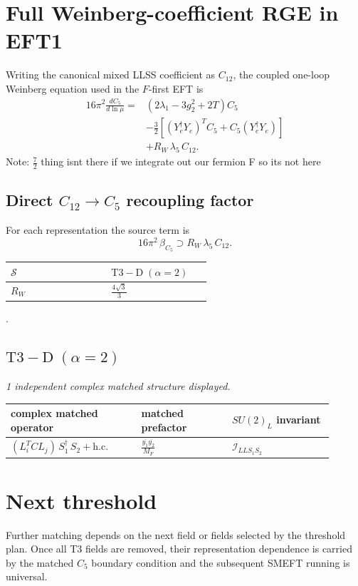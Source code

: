 \documentclass[9pt]{article}
\begin{document}
\section*{Full Weinberg-coefficient RGE in EFT1}
Writing the canonical mixed LLSS coefficient as $C_{12}$, the coupled one-loop Weinberg equation used in the $F$-first EFT is
\begin{align}
16\pi^2\frac{dC_5}{d\ln\mu}={}&(2\lambda_1-3g_2^2+2T)C_5\\
&-\frac32\left[(Y_e^\dagger Y_e)^T C_5+C_5(Y_e^\dagger Y_e)\right]\\
&+R_W\,\lambda_5\,C_{12}.
\end{align}
Note: $\frac{7}{2}$ thing isnt there if we integrate out our fermion F so its not here \subsection*{Direct $C_{12}\to C_5$ recoupling factor}
For each representation the source term is
\[16\pi^2\,\beta_{C_5}\supset R_W\,\lambda_5\,C_{12}.\]
\begin{longtable}{@{}p{0.37\linewidth}p{0.19\linewidth}@{}}
\toprule
$\mathcal{S}$ & $ \mathrm{T3-D}\;(\alpha=2) $ \\
\midrule
$R_W$ & $ \frac{4 \sqrt{3}}{3} $ \\
\bottomrule
\end{longtable}
.
\subsection*{$ \mathrm{T3-D}\;(\alpha=2) $}
\textit{1 independent complex matched structure displayed. }
\begin{longtable}{@{}p{0.36\linewidth}p{0.25\linewidth}p{0.29\linewidth}@{}}
\toprule
complex matched operator & matched prefactor & $SU(2)_L$ invariant \\
\midrule
$ (L_i^T C L_j)\,S_1^\dagger\,S_2+\mathrm{h.c.} $ & $ \frac{\overline{y_{1}} \overline{y_{2}}}{M_F} $ & $ \mathcal{I}_{LLS_1S_2} $ \\
\bottomrule
\end{longtable}
\section*{Next threshold}
Further matching depends on the next field or fields selected by the threshold plan.  Once all T3 fields are removed, their representation dependence is carried by the matched $C_5$ boundary condition and the subsequent SMEFT running is universal.
\end{document}
